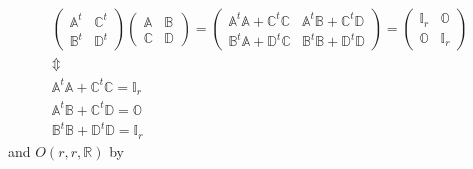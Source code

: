 \documentclass[aps,preprint]{revtex4}
\begin{document}
\begin{gather}
\left( 
\begin{array}{cc}
\mathbb{A}^{t} & \mathbb{C}^{t} \\ 
\mathbb{B}^{t} & \mathbb{D}^{t}%
\end{array}
\right) \left( 
\begin{array}{cc}
\mathbb{A} & \mathbb{B} \\ 
\mathbb{C} & \mathbb{D}%
\end{array}
\right) =\left( 
\begin{array}{cc}
\mathbb{A}^{t}\mathbb{A+C}^{t}\mathbb{C} & \mathbb{A}^{t}\mathbb{B+C}^{t}%
\mathbb{D} \\ 
\mathbb{B}^{t}\mathbb{A+D}^{t}\mathbb{C} & \mathbb{B}^{t}\mathbb{B+D}^{t}%
\mathbb{D}%
\end{array}
\right) =\left( 
\begin{array}{cc}
\mathbb{I}_{r} & \mathbb{O} \\ 
\mathbb{O} & \mathbb{I}_{r}%
\end{array}
\right) \\
\Updownarrow \\
\mathbb{A}^{t}\mathbb{A+C}^{t}\mathbb{C=I}_{r} \\
\mathbb{A}^{t}\mathbb{B+C}^{t}\mathbb{D=O} \\
\mathbb{B}^{t}\mathbb{B+D}^{t}\mathbb{D=I}_{r}
\end{gather}
and $O\left( r,r,\mathbb{R}\right) $ by 
\end{document}
